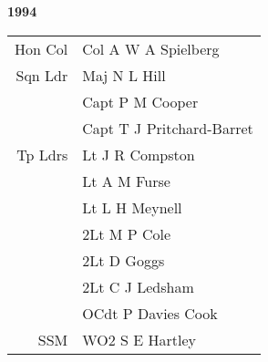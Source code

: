 \begin{center}
  \Huge
  \textbf{1994}
\end{center}

\begin{center}
  \small
  \begin{tabular}{rl}
    Hon Col & Col A W A Spielberg \\
    Sqn Ldr & Maj N L Hill \\
      & Capt P M Cooper \\
      & Capt T J Pritchard-Barret \\
    Tp Ldrs & Lt J R Compston \\
      & Lt A M Furse \\
      & Lt L H Meynell \\
      & 2Lt M P Cole \\
      & 2Lt D Goggs \\
      & 2Lt C J Ledsham \\
      & OCdt P Davies Cook \\
    SSM & WO2 S E Hartley \\
  \end{tabular}
\end{center}

